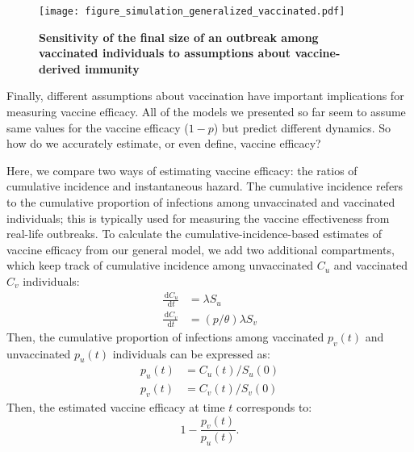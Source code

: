 \documentclass[12pt]{article}
\newcommand{\dd}[1]{\ensuremath{\, \mathrm{d}#1}}
\begin{document}
\begin{figure}[!th]
\texttt{[image: figure\_simulation\_generalized\_vaccinated.pdf]}
\caption{
\textbf{Sensitivity of the final size of an outbreak among vaccinated individuals to assumptions about vaccine-derived immunity}
\label{fig:sensitivity}
}
\end{figure}

Finally, different assumptions about vaccination have important implications for measuring vaccine efficacy.
All of the models we presented so far seem to assume same values for the vaccine efficacy ($1-p$) but predict different dynamics. 
So how do we accurately estimate, or even define, vaccine efficacy?

Here, we compare two ways of estimating vaccine efficacy: the ratios of cumulative incidence and instantaneous hazard.
The cumulative incidence refers to the cumulative proportion of infections among unvaccinated and vaccinated individuals; 
this is typically used for measuring the vaccine effectiveness from real-life outbreaks.
To calculate the cumulative-incidence-based estimates of vaccine efficacy from our general model, we add two additional compartments, which keep track of cumulative incidence among unvaccinated $C_u$ and vaccinated $C_v$ individuals:
\begin{align}
\frac{\dd C_u}{\dd t} &= \lambda S_u\\
\frac{\dd C_v}{\dd t} &= (p/\theta) \lambda S_v
\end{align}
Then, the cumulative proportion of infections among vaccinated $p_v(t)$ and unvaccinated $p_u(t)$ individuals can be expressed as:
\begin{align}
p_u(t) &= C_u(t)/S_u(0)\\
p_v(t) &= C_v(t)/S_v(0)
\end{align}
Then, the estimated vaccine efficacy at time $t$ corresponds to:
\begin{equation}
1 - \frac{p_v(t)}{p_u(t)}.
\end{equation}
\end{document}
